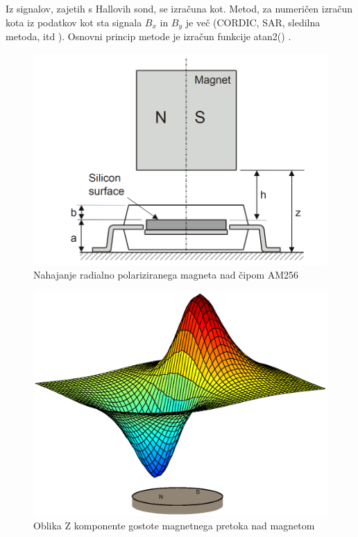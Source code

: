 Iz signalov, zajetih s Hallovih sond, se izračuna kot. Metod, za numeričen izračun kota iz podatkov kot sta signala $B_x$ in $B_y$ je več (CORDIC, SAR, sledilna metoda, itd \cite{ICHaus_interpolate}). Osnovni princip metode je izračun funkcije atan2() \cite{atan2Matlab}.
\begin{figure}[h]
	\centering
	\includegraphics[width=0.8\columnwidth]{./Slike/stranski_ris.png}
	\caption{Nahajanje radialno polariziranega magneta nad čipom AM256}
	\label{stranski_ris}
\end{figure}


\begin{figure}[h]
	\centering
	\includegraphics[width=0.8\columnwidth]{./Slike/polje_brez_ravnine.eps}
	\caption{Oblika Z komponente gostote magnetnega pretoka nad magnetom}
	\label{polje_brez_ravnine}
\end{figure}

